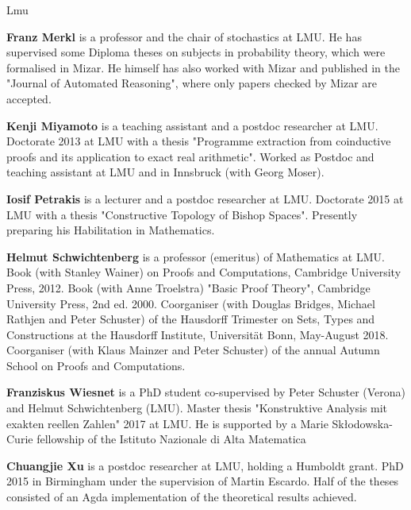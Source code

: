 \begin{sitedescription}{Lmu}
\begin{compactitem}
\item \textbf{Franz Merkl} is a professor and the chair of stochastics
  at LMU.  He has supervised some Diploma theses on subjects in
  probability theory, which were formalised in Mizar.  He himself has
  also worked with Mizar and published in the "Journal of Automated
  Reasoning", where only papers checked by Mizar are accepted.

\item \textbf{Kenji Miyamoto} is a teaching assistant and a postdoc
  researcher at LMU.  Doctorate 2013 at LMU with a thesis "Programme
  extraction from coinductive proofs and its application to exact real
  arithmetic".  Worked as Postdoc and teaching assistant at LMU and in
  Innsbruck (with Georg Moser).

\item \textbf{Iosif Petrakis} is a lecturer and a postdoc researcher
  at LMU.  Doctorate 2015 at LMU with a thesis "Constructive Topology
  of Bishop Spaces".  Presently preparing his Habilitation in
  Mathematics.

\item \textbf{Helmut Schwichtenberg} is a professor (emeritus) of
  Mathematics at LMU.  Book (with Stanley Wainer) on Proofs and
  Computations, Cambridge University Press, 2012.  Book (with Anne
  Troelstra) "Basic Proof Theory", Cambridge University Press, 2nd
  ed. 2000.  Coorganiser (with Douglas Bridges, Michael Rathjen and
  Peter Schuster) of the Hausdorff Trimester on Sets, Types and
  Constructions at the Hausdorff Institute, Universit\"at Bonn,
  May-August 2018.  Coorganiser (with Klaus Mainzer and Peter
  Schuster) of the annual Autumn School on Proofs and Computations.

\item \textbf{Franziskus Wiesnet} is a PhD student co-supervised by
  Peter Schuster (Verona) and Helmut Schwichtenberg (LMU).  Master
  thesis "Konstruktive Analysis mit exakten reellen Zahlen" 2017 at
  LMU.  He is supported by a Marie Sk{\l}odowska-Curie fellowship of
  the Istituto Nazionale di Alta Matematica

\item \textbf{Chuangjie Xu} is a postdoc researcher at LMU, holding a
  Humboldt grant.  PhD 2015 in Birmingham under the supervision of
  Martin Escardo.  Half of the theses consisted of an Agda
  implementation of the theoretical results achieved.

\end{compactitem}



\end{sitedescription}

